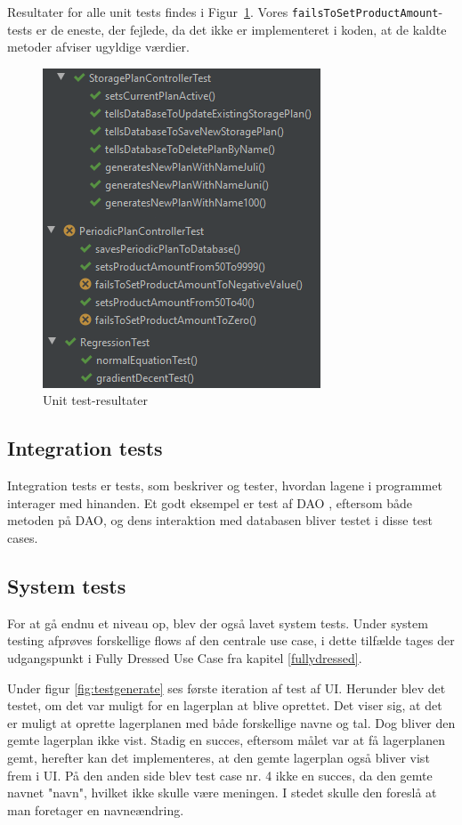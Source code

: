 Resultater for alle unit tests findes i Figur~\ref{fig:unittestresults}. Vores \texttt{failsToSetProductAmount}-tests er de eneste, der fejlede, da det ikke er implementeret i koden, at de kaldte metoder afviser ugyldige værdier.

\begin{figure}
    \centering
    \includegraphics[scale=1]{figures/tests/unittestresults}
    \caption{Unit test-resultater \label{fig:unittestresults}}
\end{figure}

\subsection{Integration tests}
Integration tests er tests, som beskriver og tester, hvordan lagene i programmet interager med hinanden. Et godt eksempel er test af DAO \cite{DAO}, eftersom både metoden på DAO, og dens interaktion med databasen bliver testet i disse test cases.

\subsection{System tests}
For at gå endnu et niveau op, blev der også lavet system tests\cite{TestLevels}. Under system testing afprøves forskellige flows af den centrale use case, i dette tilfælde tages der udgangspunkt i Fully Dressed Use Case fra kapitel \ref{fullydressed}.

Under figur \ref{fig:testgenerate} ses første iteration af test af UI. Herunder blev det testet, om det var muligt for en lagerplan at blive oprettet. Det viser sig, at det er muligt at oprette lagerplanen med både forskellige navne og tal. Dog bliver den gemte lagerplan ikke vist. Stadig en succes, eftersom målet var at få lagerplanen gemt, herefter kan det implementeres, at den gemte lagerplan også bliver vist frem i UI. På den anden side blev test case nr. 4 ikke en succes, da den gemte navnet "navn", hvilket ikke skulle være meningen. I stedet skulle den foreslå at man foretager en navneændring.

